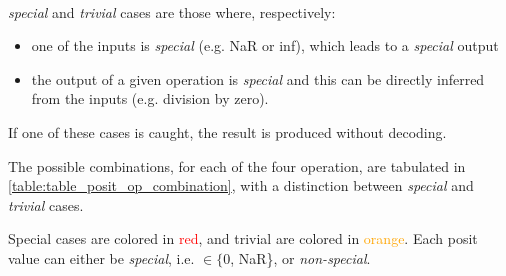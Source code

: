 \hypertarget{special_cases_link}{~}
\textit{special} and \textit{trivial} cases are those where, respectively:
\begin{itemize}
\item one of the inputs is \textit{special} (e.g. NaR or inf), which leads to a \textit{special} output
\item the output of a given operation is \textit{special} and this can be directly inferred from the inputs (e.g. division by zero).
\end{itemize}


If one of these cases is caught, the result is produced without decoding.


The possible combinations, for each of the four operation, are tabulated in \ref{table:table_posit_op_combination}, with a distinction between \textit{special} and \textit{trivial} cases.

Special cases are colored in \textcolor{red}{red}, and trivial are colored in \textcolor{orange}{orange}.
Each posit value can either be \textit{special}, i.e. $\in \{0$, \mbox{NaR}\}, or \textit{non-special}.

